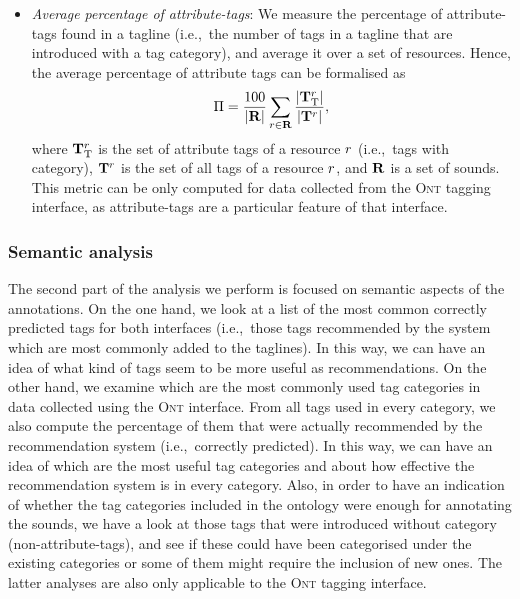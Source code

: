 \begin{itemize}

\item \textit{Average percentage of attribute-tags}: We measure the percentage of attri\-bute-tags found in a tagline (i.e.,~the number of tags in a tagline that are introduced with a tag category), and average it over a set of resources. Hence, the average percentage of attribute tags can be formalised as
\begin{equation} \Pi = \frac{100}{|\mathbf{R}|}\sum\limits_{r\in \mathbf{R}}{\frac{| \mathbf{T}_{\text{T}}^{r} |}{ | \mathbf{T}^r | }}, \label{ontology:eq:percentage_of_attribute_tags} \end{equation}
where $\mathbf{T}_{\text{T}}^{r}$ is the set of attribute tags of a resource $r$ (i.e.,~tags with category), $\mathbf{T}^r$ is the set of all tags of a resource $r$, and $\mathbf{R}$ is a set of sounds.
This metric can be only computed for data collected from the \textsc{Ont} tagging interface, as attribute-tags are a particular feature of that interface.
\end{itemize}


\subsubsection{Semantic analysis}

The second part of the analysis we perform is focused on semantic aspects of the annotations.
On the one hand, we look at a list of the most common correctly predicted tags for both interfaces (i.e.,~those tags recommended by the system which are most commonly added to the taglines). In this way, we can have an idea of what kind of tags seem to be more useful as recommendations.
On the other hand, we examine which are the most commonly used tag categories in data collected using the \textsc{Ont} interface. From all tags used in every category, we also compute the percentage of them that were actually recommended by the recommendation system (i.e.,~correctly predicted). In this way, we can have an idea of which are the most useful tag categories and about how effective the recommendation system is in every category.
Also, in order to have an indication of whether the tag categories included in the ontology were enough for annotating the sounds, we have a look at those tags that were introduced without category (non-attribute-tags), and see if these could have been categorised under the existing categories or some of them might require the inclusion of new ones.
The latter analyses are also only applicable to the \textsc{Ont} tagging interface.

